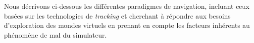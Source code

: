



Nous décrivons ci-dessous les différentes paradigmes de navigation, incluant ceux basées sur les technologies de \textit{tracking} et cherchant à répondre aux besoins d'exploration des mondes virtuels en prenant en compte les facteurs inhérents au phénomène de mal du simulateur.


